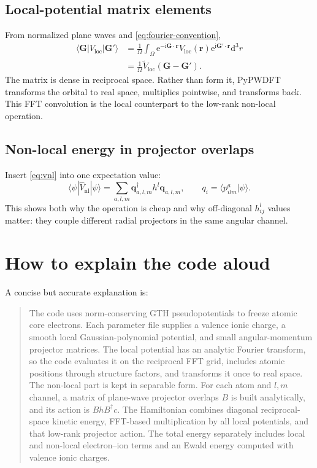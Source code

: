 \documentclass[10pt,twocolumn]{article}
\newcommand{\ii}{\mathrm{i}}
\newcommand{\e}{\mathrm{e}}
\newcommand{\dd}{\mathrm{d}}
\newcommand{\vloc}{V_{\mathrm{loc}}}
\newcommand{\vnl}{\widehat V_{\mathrm{nl}}}
\newcommand{\gvec}{\mathbf G}
\newcommand{\rvec}{\mathbf r}
\begin{document}
\subsection{Local-potential matrix elements}

From normalized plane waves and \cref{eq:fourier-convention},
\begin{align}
\langle\gvec|\vloc|\gvec'\rangle
&=\frac1\Omega\int_\Omega
\e^{-\ii\gvec\cdot\rvec}\vloc(\rvec)
\e^{\ii\gvec'\cdot\rvec}\dd^3r\\
&=\frac1\Omega
\widetilde V_{\mathrm{loc}}(\gvec-\gvec').
\end{align}
The matrix is dense in reciprocal space.  Rather than form it, PyPWDFT
transforms the orbital to real space, multiplies pointwise, and transforms
back.  This FFT convolution is the local counterpart to the low-rank
non-local operation.

\subsection{Non-local energy in projector overlaps}

Insert \cref{eq:vnl} into one expectation value:
\begin{equation}
\langle\psi|\vnl|\psi\rangle
=\sum_{a,l,m}\bm q_{a,l,m}^\dagger
h^l\bm q_{a,l,m},
\qquad
q_i=\langle p^a_{ilm}|\psi\rangle.
\end{equation}
This shows both why the operation is cheap and why off-diagonal \(h_{ij}^l\)
values matter: they couple different radial projectors in the same angular
channel.

\section{How to explain the code aloud}

A concise but accurate explanation is:
\begin{quote}\small
The code uses norm-conserving GTH pseudopotentials to freeze atomic core
electrons.  Each parameter file supplies a valence ionic charge, a smooth
local Gaussian-polynomial potential, and small angular-momentum projector
matrices.  The local potential has an analytic Fourier transform, so the code
evaluates it on the reciprocal FFT grid, includes atomic positions through
structure factors, and transforms it once to real space.  The non-local part
is kept in separable form.  For each atom and \(l,m\) channel, a matrix of
plane-wave projector overlaps \(B\) is built analytically, and its action is
\(B h B^\dagger c\).  The Hamiltonian combines diagonal reciprocal-space
kinetic energy, FFT-based multiplication by all local potentials, and that
low-rank projector action.  The total energy separately includes local and
non-local electron--ion terms and an Ewald energy computed with valence
ionic charges.
\end{quote}
\end{document}
